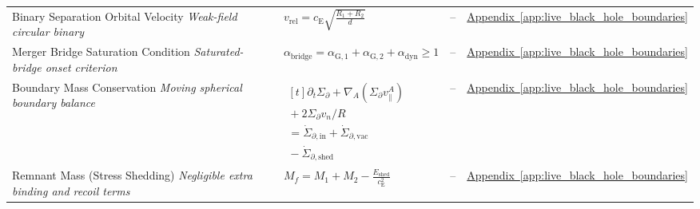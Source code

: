 \begin{longtable}{@{} p{4.5cm} p{6cm} c p{4cm} @{}}
{\raggedright Binary Separation Orbital Velocity \newline \textit{Weak-field circular binary}\par} & {\raggedright $v_{\mathrm{rel}} = c_{\mathrm{E}} \sqrt{\frac{R_1+R_2}{d}}$\par} & -- & {\raggedright \hyperref[app:live_black_hole_boundaries]{Appendix~\ref*{app:live_black_hole_boundaries}}\par} \\

{\raggedright Merger Bridge Saturation Condition \newline \textit{Saturated-bridge onset criterion}\par} & {\raggedright $\alpha_{\mathrm{bridge}} = \alpha_{\mathrm{G},1} + \alpha_{\mathrm{G},2} + \alpha_{\mathrm{dyn}} \geq 1$\par} & -- & {\raggedright \hyperref[app:live_black_hole_boundaries]{Appendix~\ref*{app:live_black_hole_boundaries}}\par} \\

{\raggedright Boundary Mass Conservation \newline \textit{Moving spherical boundary balance}\par} & {\raggedright $\begin{gathered}[t]\partial_t\Sigma_\partial+\nabla_A(\Sigma_\partial v_\parallel^A) \\ {}+2\Sigma_\partial v_n/R \\ =\dot\Sigma_{\partial,\mathrm{in}}+\dot\Sigma_{\partial,\mathrm{vac}} \\ {}-\dot\Sigma_{\partial,\mathrm{shed}}\end{gathered}$\par} & -- & {\raggedright \hyperref[app:live_black_hole_boundaries]{Appendix~\ref*{app:live_black_hole_boundaries}}\par} \\

{\raggedright Remnant Mass (Stress Shedding) \newline \textit{Negligible extra binding and recoil terms}\par} & {\raggedright $M_f = M_1 + M_2 - \frac{E_{\mathrm{shed}}}{c_{\mathrm{E}}^2}$\par} & -- & {\raggedright \hyperref[app:live_black_hole_boundaries]{Appendix~\ref*{app:live_black_hole_boundaries}}\par} \\


\end{longtable}
